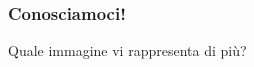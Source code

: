 \begin{contentframe}
    \frametitle{Conosciamoci!}
    
    Quale immagine vi rappresenta di più?

    \bigskip
    \begin{columns}
        \centering
        
        \centering
        
        \centering
    \end{columns}
\end{contentframe}
